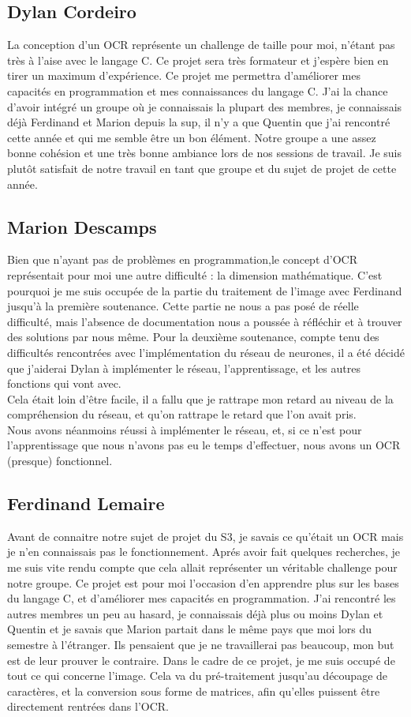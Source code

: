 \documentclass[14pt]{article}
\begin{document}
\subsection{Dylan Cordeiro}
La conception d'un OCR représente un challenge de taille pour moi, n'étant pas très à l'aise avec le langage C. Ce projet sera très formateur et j'espère bien en tirer un maximum d'expérience. Ce projet me permettra d'améliorer mes capacités en programmation et mes connaissances du langage C. J'ai la chance d'avoir intégré un groupe où je connaissais la plupart des membres, je connaissais déjà Ferdinand et Marion depuis la sup, il n'y a que Quentin que j'ai rencontré cette année et qui me semble être un bon élément. Notre groupe a une assez bonne cohésion et une très bonne ambiance lors de nos sessions de travail. Je suis plutôt satisfait de notre travail en tant que groupe et du sujet de projet de cette année.
\newpage
\subsection{Marion Descamps}
Bien que n'ayant pas de problèmes en programmation,le concept d'OCR représentait pour moi une autre difficulté : la dimension mathématique. C'est pourquoi je me suis occupée de la partie du traitement de l'image avec Ferdinand jusqu'à la première soutenance.
Cette partie ne nous a pas posé de réelle difficulté, mais l'absence de documentation nous a poussée à réfléchir et à trouver des solutions par nous même.
Pour la deuxième soutenance, compte tenu des difficultés rencontrées avec l'implémentation du réseau de neurones, il a été décidé que j'aiderai Dylan à implémenter le réseau, l'apprentissage, et les autres fonctions qui vont avec.\\
Cela était loin d'être facile, il a fallu que je rattrape mon retard au niveau de la compréhension du réseau, et qu'on rattrape le retard que l'on avait pris.\\
Nous avons néanmoins réussi à implémenter le réseau, et, si ce n'est pour l'apprentissage que nous n'avons pas eu le temps d'effectuer, nous avons un OCR (presque) fonctionnel.\\

\newpage
\subsection{Ferdinand Lemaire}
Avant de connaitre notre sujet de projet du S3, je savais ce qu'était un OCR mais je n'en connaissais pas le fonctionnement. Aprés avoir fait quelques recherches, je me suis vite rendu compte que cela allait représenter un véritable challenge pour notre groupe. Ce projet est pour moi l'occasion d'en apprendre plus sur les bases du langage C, et d'améliorer mes capacités en programmation. J'ai rencontré les autres membres un peu au hasard, je connaissais déjà plus ou moins Dylan et Quentin et je savais que Marion partait dans le même pays que moi lors du semestre à l'étranger. Ils pensaient que je ne travaillerai pas beaucoup, mon but est de leur prouver le contraire.
Dans le cadre de ce projet, je me suis occupé de tout ce qui concerne l'image. Cela va du pré-traitement jusqu'au découpage de caractères, et la conversion sous forme de matrices, afin qu'elles puissent être directement rentrées dans l'OCR.
\newpage
\end{document}
